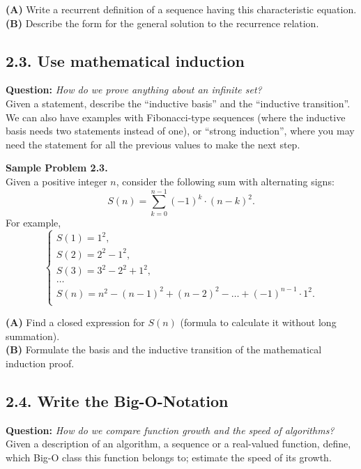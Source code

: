 \documentclass[jou]{apa6}
\begin{document}
{\bf (A)} Write a recurrent definition of a sequence having this characteristic equation.\\
{\bf (B)} Describe the form for the general solution to the recurrence relation.



\subsection{2.3. Use mathematical induction}

{\bf Question:} {\em How do we prove anything about an infinite set?}\\
{\scriptsize 
Given a statement, describe the “inductive basis” and the ``inductive transition''. 
We can also have examples with Fibonacci-type sequences 
(where the inductive basis needs two statements instead of one), 
or ``strong induction'', where you may need the statement 
for all the previous values to make the next step.
}

\vspace{6pt}
{\bf Sample Problem 2.3.}\\
Given a positive integer $n$, consider the following sum with alternating signs:
$$S(n) = \sum\limits_{k=0}^{n-1} (-1)^k \cdot (n-k)^2.$$
For example, 
$$\left\{ \begin{array}{l}
S(1) = 1^2,\\
S(2) = 2^2 - 1^2,\\
S(3) = 3^2 - 2^2 + 1^2,\\
\ldots \\
S(n) = n^2 - (n-1)^2 + (n-2)^2 - \ldots + (-1)^{n-1} \cdot 1^2.\\
\end{array}
\right.$$

{\bf (A)} Find a closed expression for $S(n)$ (formula to calculate it without long summation).\\
{\bf (B)} Formulate the basis and the inductive transition of 
the mathematical induction proof.



\subsection{2.4. Write the Big-O-Notation} 

{\bf Question:} {\em How do we compare function growth and the speed of algorithms?}\\
{\scriptsize 
Given a description of an algorithm, a sequence or a real-valued function, 
define, which Big-O class this function belongs to; estimate the speed of its growth.
}
\end{document}

